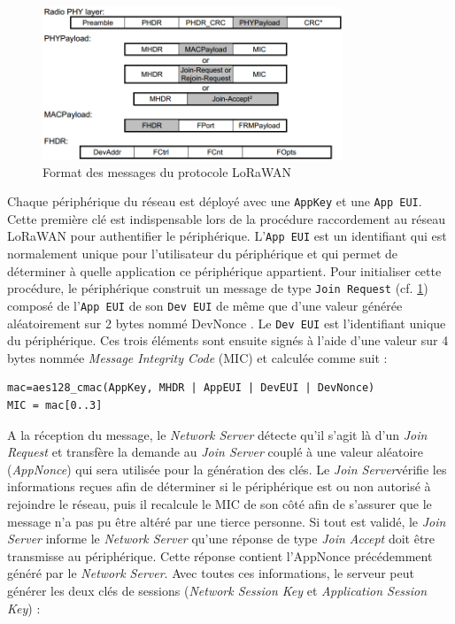 \begin{figure}[ht!]
    \centering
    \includegraphics[width=0.8\textwidth]{Figures/Protocols/LoRaWAN/lorawan_mac_format_packets.png}
    \caption{Format des messages du protocole LoRaWAN}
    \label{fig-lorawan_mac_format_packets2}
\end{figure}

Chaque périphérique du réseau est déployé avec une \texttt{AppKey} et une \texttt{App EUI}. Cette première clé est indispensable lors de la procédure raccordement au réseau LoRaWAN pour authentifier le périphérique. L'\texttt{App EUI} est un identifiant qui est normalement unique pour l'utilisateur du périphérique et qui permet de déterminer à quelle application ce périphérique appartient. 
Pour initialiser cette procédure, le périphérique construit un message de type \texttt{Join Request} (cf. \cref{fig-lorawan_mac_format_packets2}) composé de l'\texttt{App EUI} de son \texttt{Dev EUI} de même que d'une valeur générée aléatoirement sur 2 bytes nommé DevNonce \cite{LoRaSecu3:online}. Le \texttt{Dev EUI} est l'identifiant unique du périphérique. Ces trois éléments sont ensuite signés à l'aide d'une valeur sur 4 bytes nommée \textit{Message Integrity Code} (MIC) et calculée comme suit :

\begin{tcolorbox}[top=-3mm, bottom=-3mm, left=0mm, right=0mm, enhanced, breakable, colback=LightGray, colframe=DarkGray, colbacktitle=DarkGray]
\begin{verbatim}
mac=aes128_cmac(AppKey, MHDR | AppEUI | DevEUI | DevNonce)
MIC = mac[0..3]
\end{verbatim}
\end{tcolorbox}


A la réception du message, le \textit{Network Server} détecte qu'il s'agit là d'un \textit{Join Request} et transfère la demande au \textit{Join Server} couplé à une valeur aléatoire (\textit{AppNonce}) qui sera utilisée pour la génération des clés. Le \textit{Join Server}vérifie les informations reçues afin de déterminer si le périphérique est ou non autorisé à rejoindre le réseau, puis il recalcule le MIC de son côté afin de s'assurer que le message n'a pas pu être altéré par une tierce personne. Si tout est validé, le \textit{Join Server} informe le \textit{Network Server} qu'une réponse de type \textit{Join Accept} doit être transmisse au périphérique. Cette réponse contient l'AppNonce précédemment généré par le \textit{Network Server}. Avec toutes ces informations, le serveur peut générer les deux clés de sessions (\textit{Network Session Key} et \textit{Application Session Key}) :


